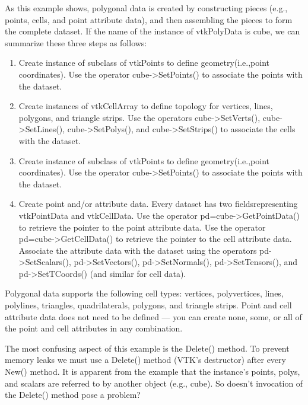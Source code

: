 As this example shows, polygonal data is created by constructing pieces (e.g., points, cells, and point attribute data), and then assembling the pieces to form the complete dataset. If the name of the instance of vtkPolyData is cube, we can summarize these three steps as follows:

\begin{enumerate}

	\item Create instance of subclass of vtkPoints to define geometry(i.e.,point coordinates). Use the operator cube->SetPoints() to associate the points with the dataset.

	\item Create instances of vtkCellArray to define topology for vertices, lines, polygons, and triangle strips. Use the operators cube->SetVerts(), cube->SetLines(), cube->SetPolys(), and cube->SetStrips() to associate the cells with the dataset.

	\item Create instance of subclass of vtkPoints to define geometry(i.e.,point coordinates). Use the operator cube->SetPoints() to associate the points with the dataset.

	\item Create point and/or attribute data. Every dataset has two fieldsrepresenting vtkPointData and vtkCellData. Use the operator pd=cube->GetPointData() to retrieve the pointer to the point attribute data. Use the operator pd=cube->GetCellData() to retrieve the pointer to the cell attribute data. Associate the attribute data with the dataset using the operators pd->SetScalars(), pd->SetVectors(), pd->SetNormals(), pd->SetTensors(), and pd->SetTCoords() (and similar for cell data).

\end{enumerate}

Polygonal data supports the following cell types: vertices, polyvertices, lines, polylines, triangles, quadrilaterals, polygons, and triangle strips. Point and cell attribute data does not need to be defined  --- you can create none, some, or all of the point and cell attributes in any combination.

The most confusing aspect of this example is the Delete() method. To prevent memory leaks we must use a Delete() method (VTK's destructor) after every New() method. It is apparent from the example that the instance's points, polys, and scalars are referred to by another object (e.g., cube). So doesn’t invocation of the Delete() method pose a problem?


